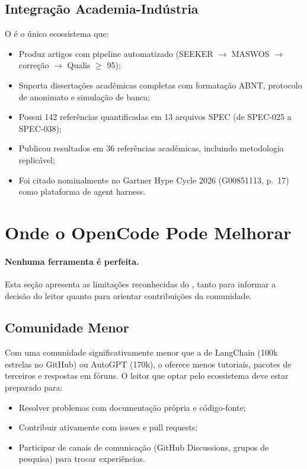 \subsection{Integração Academia-Indústria}
O \opencodeeco{} é o único ecossistema que:
\begin{itemize}
\item Produz artigos \qualisA{} com pipeline automatizado
(SEEKER $\rightarrow$ MASWOS $\rightarrow$ correção
$\rightarrow$ Qualis $\ge$ 95);
\item Suporta dissertações acadêmicas completas com formatação
ABNT, protocolo de anonimato e simulação de banca;
\item Possui 142 referências quantificadas em 13 arquivos SPEC
(de SPEC-025 a SPEC-038);
\item Publicou resultados em 36 referências acadêmicas,
incluindo metodologia replicável;
\item Foi citado nominalmente no Gartner Hype Cycle 2026
(G00851113, p.~17) como plataforma de agent harness.
\end{itemize}
\section{Onde o OpenCode Pode Melhorar}
\label{sec:melhorar}
\nivelavancado
\paragraph{Nenhuma ferramenta é perfeita.} Esta seção apresenta as
limitações reconhecidas do \opencodeeco{}, tanto para informar a
decisão do leitor quanto para orientar contribuições da comunidade.
\subsection{Comunidade Menor}
Com uma comunidade significativamente menor que a de LangChain (100k
estrelas no GitHub) ou AutoGPT (170k), o \opencodeeco{} oferece menos
tutoriais, pacotes de terceiros e respostas em fóruns. O leitor que
optar pelo ecossistema deve estar preparado para:
\begin{itemize}
\item Resolver problemas com documentação própria e código-fonte;
\item Contribuir ativamente com issues e pull requests;
\item Participar de canais de comunicação (GitHub Discussions,
grupos de pesquisa) para trocar experiências.
\end{itemize}
